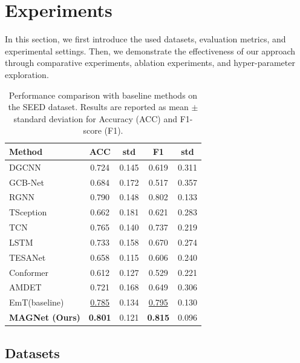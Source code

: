 \documentclass[runningheads]{llncs}
\begin{document}
\section{Experiments}
In this section, we first introduce the used datasets, evaluation metrics, and experimental settings. Then, we demonstrate the effectiveness of our approach through comparative
experiments, ablation experiments, and hyper-parameter exploration.%



\begin{table}[htbp] %
\caption{Performance comparison with baseline methods on the SEED dataset. Results are reported as mean $\pm$ standard deviation for Accuracy (ACC) and F1-score (F1).}
\label{tab:baseline_comparison}
\centering %
\begin{tabular}{lcccc}
\hline
\textbf{Method} & \textbf{ACC} & \textbf{std} & \textbf{F1} & \textbf{std} \\
\hline
DGCNN         & 0.724 & 0.145 & 0.619 & 0.311 \\
GCB-Net    & 0.684 & 0.172 & 0.517 & 0.357 \\
RGNN & 0.790 & 0.148 & 0.802 & 0.133 \\
TSception   & 0.662 & 0.181 & 0.621 & 0.283 \\
TCN & 0.765 & 0.140 & 0.737 & 0.219 \\
LSTM    & 0.733 & 0.158 & 0.670 & 0.274 \\
TESANet & 0.658 & 0.115 & 0.606 & 0.240 \\
Conformer & 0.612 & 0.127 & 0.529 & 0.221 \\
AMDET & 0.721 & 0.168 & 0.649 & 0.306 \\
\hline
EmT(baseline) & \underline{0.785} & 0.134 & \underline{0.795} & 0.130 \\
\hline
\textbf{MAGNet (Ours)} & \textbf{0.801} & 0.121 & \textbf{0.815} & 0.096 \\
\hline
\end{tabular}
\end{table}






\subsection{Datasets}
\label{subsec:datasets} %
\end{document}
